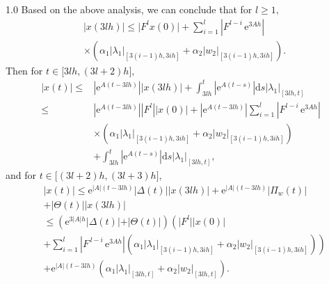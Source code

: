 \documentclass[journal]{IEEEtran}
\begin{document}
\begin{spacing}{1.0}
Based on the above analysis, we can conclude that for $l\geq1,$
\begin{align}
  &\vert x(3lh) \vert \leq  \vert F^{l}x(
0) \vert +\sum_{i=1}^{l}\left \vert F^{l-i}\, \mathrm{e}^{3Ah}\right \vert\nonumber \\
&   \times\left(
\alpha_{1}\left \vert \lambda_{1}\right \vert _{[3(i-1)h,3ih]}+\alpha
_{2}\left\vert w_{2}\right\vert _{[3(i-1)h,3ih]}\right)  .\label{x_3lh_1}%
\end{align}
Then for $t\in\lbrack3lh,(3l+2)h],$
\begin{align}
\left\vert x\left(  t\right)  \right\vert \leq &  \left\vert \mathrm{e}%
^{A\left(  t-3lh\right)  }\right\vert \left\vert x\left(  3lh\right)
\right\vert +\int_{3lh}^{t}\left\vert \mathrm{e}^{A\left(  t-s\right)
}\right\vert \mathrm{d}s\left\vert \lambda_{1}\right\vert _{[3lh,t]}%
\nonumber\\
\leq &  \left\vert \mathrm{e}^{A\left(  t-3lh\right)  }\right\vert \left\vert
F^{l}\right\vert \left\vert x\left(  0\right)  \right\vert +\left\vert \mathrm{e}^{A\left(  t-3lh\right)  }\right\vert \sum_{i=1}%
^{l}\left\vert F^{l-i}\,\mathrm{e}^{3Ah}\right\vert \nonumber\\
&  \times\left(  \alpha_{1}\left\vert \lambda_{1}\right\vert _{[3(i-1)h,3ih]}%
+\alpha_{2}\left\vert w_{2}\right\vert _{[3(i-1)h,3ih]}\right) \nonumber\\
&  +\int_{3lh}^{t}\left\vert \mathrm{e}^{A\left(  t-s\right)  }\right\vert
\mathrm{d}s\left\vert \lambda_{1}\right\vert _{[3lh,t]}, \label{x_11}%
\end{align}
and for $t\in\lbrack(3l+2)h,(3l+3)h],$
\begin{align}
&\vert x(t)\vert  \leq\mathrm{e}^{\vert
A\vert(t-3lh)}\vert \mathit{\Delta}(t)\vert
\vert x(3lh)\vert +\mathrm{e}^{\vert
A\vert(t-3lh)}\vert \mathit{\Pi}_{w}(
t)\vert \nonumber\\
&  +\vert \mathit{\Theta}(t)\vert \vert x(3lh)
\vert \nonumber\\
&  \leq(\mathrm{e}^{3\vert A\vert h}\vert
\mathit{\Delta}(t)\vert +\vert \mathit{\Theta}(t)\vert
) \left(\vert F^{l}\vert \vert x(0)
\vert\right. \nonumber\\
&  +\left.  \sum_{i=1}^{l}\left\vert F^{\,l-i}\,\mathrm{e}^{3Ah}%
\right\vert \left(  \alpha_{1}\left\vert \lambda_{1}\right\vert
_{[3(i-1)h,3ih]}+\alpha_{2}\left\vert w_{2}\right\vert _{[3(i-1)h,3ih]}\right)  \right) \nonumber\\
&  +\mathrm{e}^{\left\vert A\right\vert \left(  t-3lh\right)  }\left(
\alpha_{1}\left\vert \lambda_{1}\right\vert _{[3lh,t]}+\alpha_{2}\left\vert w_{2}\right\vert _{[3lh,t]
}\right)  . \label{x_22}%
\end{align}



\end{spacing}
\end{document}
